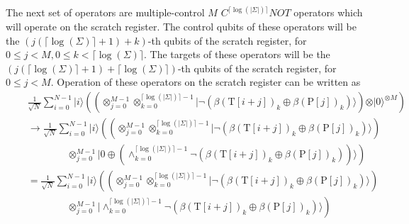 The next set of operators are multiple-control $M$ $C^{\lceil\log(\vert\Sigma\vert)\rceil}NOT$ operators which will operate on the scratch register. The control qubits of these operators will be the $(j(\lceil\log(\Sigma)\rceil + 1) + k)$-th qubits of the scratch register, for $0 \leq j < M, 0 \leq k < \lceil\log(\Sigma)\rceil$. The targets of these operators will be the $(j(\lceil\log(\Sigma)\rceil + 1) + \lceil\log(\Sigma)\rceil)$-th qubits of the scratch register, for $0 \leq j < M$. Operation of these operators on the scratch register can be written as
\begin{align*}
	\quad & \frac{1}{\sqrt{N}} \sum_{i=0}^{N-1} \vert i \rangle \left( \left(\otimes_{j=0}^{M-1}\otimes_{k=0}^{\lceil \log(\vert\Sigma\vert) \rceil-1} \vert \neg\left( \beta(\text{T}[i+j])_k \oplus \beta(\text{P}[j])_{k} \right) \rangle \right) \otimes \vert 0 \rangle^{\otimes M} \right)\\
	\quad & \rightarrow \frac{1}{\sqrt{N}} \sum_{i=0}^{N-1} \vert i \rangle \left( \left(\otimes_{j=0}^{M-1}\otimes_{k=0}^{\lceil \log(\vert\Sigma\vert) \rceil-1} \vert \neg\left( \beta(\text{T}[i+j])_k \oplus \beta(\text{P}[j])_{k} \right) \rangle \right)\right.\\
	\quad & \quad\quad\quad\quad \left.\otimes_{j=0}^{M-1} \vert 0 \oplus \left( \wedge_{k=0}^{\lceil \log(\vert\Sigma\vert) \rceil-1} \neg\left( \beta(\text{T}[i+j])_k \oplus \beta(\text{P}[j])_{k} \right) \right) \rangle \right)\\
	\quad & = \frac{1}{\sqrt{N}} \sum_{i=0}^{N-1} \vert i \rangle \left( \left(\otimes_{j=0}^{M-1}\otimes_{k=0}^{\lceil \log(\vert\Sigma\vert) \rceil-1} \vert \neg\left( \beta(\text{T}[i+j])_k \oplus \beta(\text{P}[j])_{k} \right) \rangle \right)\right.\\
	\quad & \quad\quad\quad\quad \left.\otimes_{j=0}^{M-1} \vert \wedge_{k=0}^{\lceil \log(\vert\Sigma\vert) \rceil-1} \neg\left( \beta(\text{T}[i+j])_k \oplus \beta(\text{P}[j])_{k} \right) \rangle \right)	
\end{align*}

